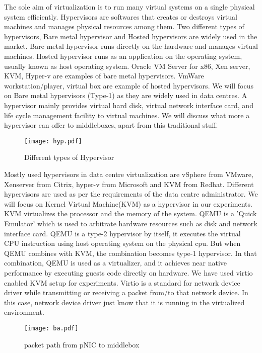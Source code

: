 \documentclass[a4paper,11pt]{report}
\begin{document}
The sole aim of virtualization is to run many virtual systems on a single physical system efficiently. Hypervisors are softwares that creates or destroys virtual machines and manages physical resources among them. Two different types of hypervisors, Bare metal hypervisor and Hosted hypervisors are widely used in the market. Bare metal hypervisor runs directly on the hardware and manages virtual machines. Hosted hypervisor runs as an application on the operating system, usually known as host operating system. Oracle VM Server for x86, Xen server, KVM, Hyper-v are examples of bare metal hypervisors. VmWare workstation/player, virtual box are example of hosted hypervisors. We will focus on Bare metal hypervisors (Type-1) as they are widely used in data centres. A hypervisor mainly provides virtual hard disk, virtual network interface card, and life cycle management facility to virtual machines. We will discuss what more a hypervisor can offer to middleboxes, apart from this traditional stuff. 
\begin{figure}[h]
\centering
\texttt{[image: hyp.pdf]}
\caption{Different types of Hypervisor}
\end{figure}  
Mostly used hypervisors in data centre virtualization are vSphere from VMware, Xenserver from Citrix, hyper-v from Microsoft and KVM from Redhat. Different hypervisors are used as per the requirements of the data centre administrator. We will focus on Kernel Virtual Machine(KVM) as a hypervisor in our experiments. KVM virtualizes the processor and the memory of the system. QEMU is a 'Quick Emulator' which is used to arbitrate hardware resources such as disk and network interface card. QEMU is a type-2 hypervisor by itself, it executes the virtual CPU instruction using host operating system on the physical cpu. But when QEMU combines with KVM, the combination becomes type-1 hypervisor. In that combination, QEMU is used as a virtualizer, and it achieves near native performance by executing guests code directly on hardware. We have used virtio enabled KVM setup for experiments. Virtio is a standard for network device driver while transmitting or receiving a packet from/to that network device. In this case, network device driver just know that it is running in the virtualized environment.

\begin{figure}[h]
\centering
\texttt{[image: ba.pdf]}
\caption{packet path from pNIC to middlebox}
\end{figure}
\end{document}

